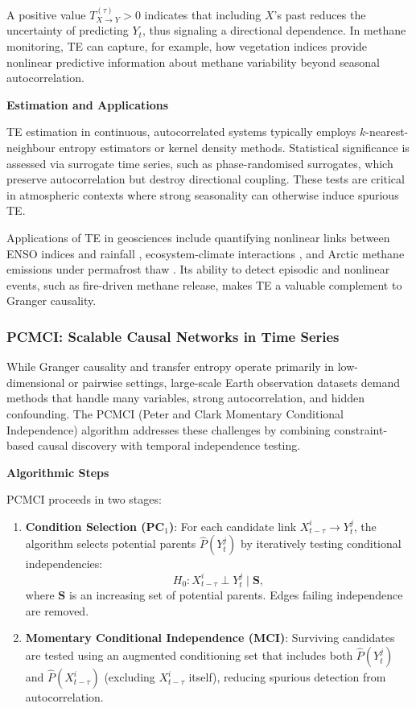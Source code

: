 A positive value $T_{X \rightarrow Y}^{(\tau)}>0$ indicates that including $X$'s past reduces the uncertainty of predicting $Y_t$, thus signaling a directional dependence. In methane monitoring, TE can capture, for example, how vegetation indices provide nonlinear predictive information about methane variability beyond seasonal autocorrelation.

\textbf{Estimation and Applications}

TE estimation in continuous, autocorrelated systems typically employs $k$-nearest-neighbour entropy estimators \cite{Kraskov2004} or kernel density methods. Statistical significance is assessed via surrogate time series, such as phase-randomised surrogates, which preserve autocorrelation but destroy directional coupling. These tests are critical in atmospheric contexts where strong seasonality can otherwise induce spurious TE.

Applications of TE in geosciences include quantifying nonlinear links between ENSO indices and rainfall \cite{tongal_forecasting_2021}, ecosystem-climate interactions \cite{Benocci2025}, and Arctic methane emissions under permafrost thaw \cite{Knox2024}. Its ability to detect episodic and nonlinear events, such as fire-driven methane release, makes TE a valuable complement to Granger causality.

\subsubsection{PCMCI: Scalable Causal Networks in Time Series}

While Granger causality and transfer entropy operate primarily in low-dimensional or pairwise settings, large-scale Earth observation datasets demand methods that handle many variables, strong autocorrelation, and hidden confounding. The PCMCI (Peter and Clark Momentary Conditional Independence) algorithm \cite{Runge2019} addresses these challenges by combining constraint-based causal discovery with temporal independence testing.

\textbf{Algorithmic Steps}

PCMCI proceeds in two stages:

\begin{enumerate}
\item \textbf{Condition Selection (PC$_1$)}: For each candidate link $X_{t-\tau}^i \rightarrow Y_t^j$, the algorithm selects potential parents $\hat{P}(Y_t^j)$ by iteratively testing conditional independencies:
\begin{equation}
H_0: X_{t-\tau}^i \perp Y_t^j \; | \; \mathbf{S},
\end{equation}
where $\mathbf{S}$ is an increasing set of potential parents. Edges failing independence are removed.
\item \textbf{Momentary Conditional Independence (MCI)}: Surviving candidates are tested using an augmented conditioning set that includes both $\hat{P}(Y_t^j)$ and $\hat{P}(X_{t-\tau}^i)$ (excluding $X_{t-\tau}^i$ itself), reducing spurious detection from autocorrelation.
\end{enumerate}

